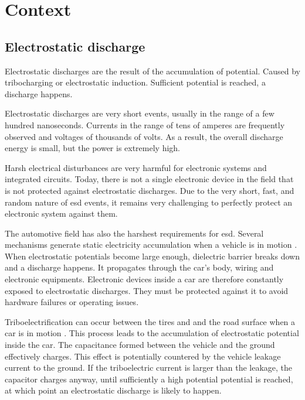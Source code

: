 \section{Context}
\subsection{Electrostatic discharge}

Electrostatic discharges are the result of the accumulation of potential.
Caused by tribocharging or electrostatic induction.
Sufficient potential is reached, a discharge happens.

Electrostatic discharges are very short events, usually in the range of a few hundred nanoseconds.
Currents in the range of tens of amperes are frequently observed and voltages of thousands of volts.
As a result, the overall discharge energy is small, but the power is extremely high.

Harsh electrical disturbances are very harmful for electronic systems and integrated circuits.
Today, there is not a single electronic device in the field that is not protected against electrostatic discharges.
Due to the very short, fast, and random nature of \gls{esd} events, it remains very challenging to perfectly protect an electronic system against them.

The automotive field has also the harshest requirements for \gls{esd}.
Several mechanisms generate static electricity accumulation when a vehicle is in motion \cite{generationESDautomotive}.
When electrostatic potentials become large enough, dielectric barrier breaks down and a discharge happens.
It propagates through the car's body, wiring and electronic equipments.
Electronic devices inside a car are therefore constantly exposed to electrostatic discharges.
They must be protected against it to avoid hardware failures or operating issues.

Triboelectrification can occur between the tires and and the road surface when a car is in motion \cite{generationESDautomotive}.
This process leads to the accumulation of electrostatic potential inside the car.
The capacitance formed between the vehicle and the ground effectively charges.
This effect is potentially countered by the vehicle leakage current to the ground.
If the triboelectric current is larger than the leakage, the capacitor charges anyway, until sufficiently a high potential potential is reached, at which point an electrostatic discharge is likely to happen.

